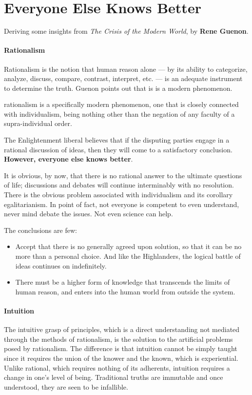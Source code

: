 \section{Everyone Else Knows Better}

Deriving some insights from \emph{The Crisis of the Modern World}, by \textbf{Rene Guenon}. 

\paragraph{Rationalism}
Rationalism is the notion that human reason alone — by its ability to categorize, analyze, discuss, compare, contrast, interpret, etc. — is an adequate instrument to determine the truth. Guenon points out that is is a modern phenomenon.

\begin{quotex}
rationalism is a specifically modern phenomenon, one that is closely connected with individualism, being nothing other than the negation of any faculty of a supra-individual order.

\end{quotex}
The Enlightenment liberal believes that if the disputing parties engage in a rational discussion of ideas, then they will come to a satisfactory conclusion. \textbf{However, everyone else knows better}.

It is obvious, by now, that there is no rational answer to the ultimate questions of life; discussions and debates will continue interminably with no resolution. There is the obvious problem associated with individualism and its corollary egalitarianism. In point of fact, not everyone is competent to even understand, never mind debate the issues. Not even science can help.

The conclusions are few:

\begin{itemize}
\item Accept that there is no generally agreed upon solution, so that it can be no more than a personal choice. And like the Highlanders, the logical battle of ideas continues on indefinitely. 
\item There must be a higher form of knowledge that transcends the limits of human reason, and enters into the human world from outside the system. 
\end{itemize}
\paragraph{Intuition}
The intuitive grasp of principles, which is a direct understanding not mediated through the methods of rationalism, is the solution to the artificial problems posed by rationalism. The difference is that intuition cannot be simply taught since it requires the union of the knower and the known, which is experiential. Unlike rational, which requires nothing of its adherents, intuition requires a change in one's level of being. Traditional truths are immutable and once understood, they are seen to be infallible.

